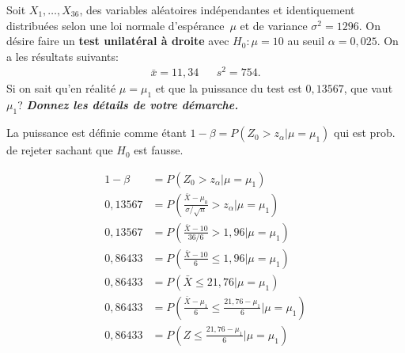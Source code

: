\begin{questions}
\begin{solution}
\end{solution}

\newpage 

\question[9] Soit $X_1,\hdots, X_{36}$, des variables aléatoires indépendantes et identiquement distribuées selon une loi normale d'espérance~$\mu$ et de variance $\sigma^2=1296$.
On désire faire un \textbf{test unilatéral à droite} avec $H_0:\mu=10$ au seuil $\alpha = 0,025$.
On a les résultats suivants:
\begin{align*}
    \bar{x}= 11,34 &  & s^2=754.
\end{align*}
Si on sait qu'en réalité $\mu=\mu_1$ et que la puissance du test est $0,13567$, que vaut $\mu_1$? \textbf{\textit{Donnez les détails de votre démarche.}}

\begin{solution}
    La puissance est définie comme étant $1-\beta=P(Z_0>z_{\alpha}|\mu=\mu_1)$ qui est prob. de rejeter sachant que $H_0$ est fausse.

    \begin{align*}
        1-\beta &= P(Z_0>z_{\alpha}|\mu=\mu_1)\\
        0,13567&= P\left(\frac{\bar{X}-\mu_0}{\sigma/\sqrt{n}}>z_{\alpha}|\mu=\mu_1\right)\\
        0,13567&= P\left(\frac{\bar{X}-10}{36/6}>1,96|\mu=\mu_1\right)\\
        0,86433&= P\left(\frac{\bar{X}-10}{6}\leq1,96|\mu=\mu_1\right)\\
        0,86433&= P\left(\bar{X}\leq21,76|\mu=\mu_1\right)\\
        0,86433&=P\left(\frac{\bar{X}-\mu_1}{6}\leq\frac{21,76-\mu_1}{6}|\mu=\mu_1\right)\\
        0,86433&=P\left(Z\leq\frac{21,76-\mu_1}{6}|\mu=\mu_1\right)\\
    \end{align*}


\end{solution}
\end{questions}
